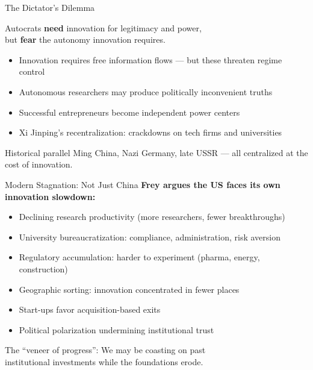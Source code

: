 \documentclass[aspectratio=169, 11pt]{beamer}
\begin{document}
\begin{frame}{The Dictator's Dilemma}
    \begin{center}
        \Large
        Autocrats \textbf{need} innovation for legitimacy and power, \\
        but \textbf{fear} the autonomy innovation requires.
    \end{center}

    \vspace{1em}
    \pause

    \begin{itemize}
        \item Innovation requires free information flows --- but these threaten regime control
        \item Autonomous researchers may produce politically inconvenient truths
        \item Successful entrepreneurs become independent power centers
        \item Xi Jinping's recentralization: crackdowns on tech firms and universities
    \end{itemize}

    \vspace{0.5em}
    \pause

    \begin{block}{Historical parallel}
        Ming China, Nazi Germany, late USSR --- all centralized at the cost of innovation.
    \end{block}
\end{frame}

\begin{frame}{Modern Stagnation: Not Just China}
    \textbf{Frey argues the US faces its own innovation slowdown:}

    \begin{itemize}
        \item Declining research productivity (more researchers, fewer breakthroughs)
        \item University bureaucratization: compliance, administration, risk aversion
        \item Regulatory accumulation: harder to experiment (pharma, energy, construction)
        \item Geographic sorting: innovation concentrated in fewer places
        \item Start-ups favor acquisition-based exits
        \item Political polarization undermining institutional trust
    \end{itemize}

    \vspace{0.5em}

    \begin{center}
        \alert{The ``veneer of progress'':} We may be coasting on past \\ institutional investments while the foundations erode.
    \end{center}
\end{frame}
\end{document}
